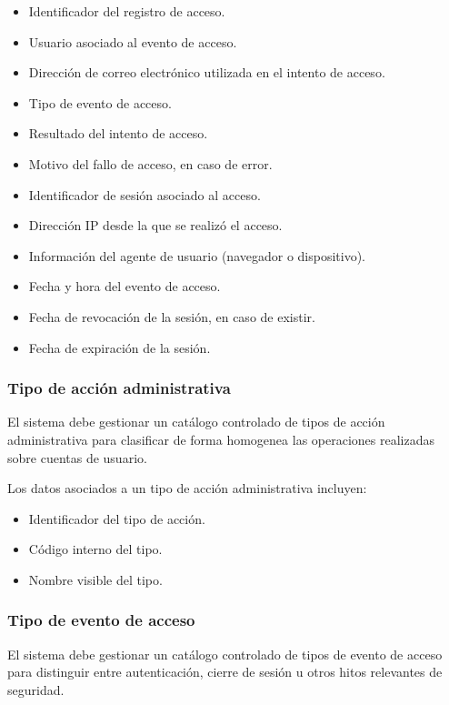 \begin{itemize}
    \item Identificador del registro de acceso.
    \item Usuario asociado al evento de acceso.
    \item Dirección de correo electrónico utilizada en el intento de acceso.
    \item Tipo de evento de acceso.
    \item Resultado del intento de acceso.
    \item Motivo del fallo de acceso, en caso de error.
    \item Identificador de sesión asociado al acceso.
    \item Dirección IP desde la que se realizó el acceso.
    \item Información del agente de usuario (navegador o dispositivo).
    \item Fecha y hora del evento de acceso.
    \item Fecha de revocación de la sesión, en caso de existir.
    \item Fecha de expiración de la sesión.
\end{itemize}

\subsubsection*{Tipo de acción administrativa}

El sistema debe gestionar un catálogo controlado de tipos de acción administrativa para clasificar de forma homogenea las operaciones realizadas sobre cuentas de usuario.

Los datos asociados a un tipo de acción administrativa incluyen:

\begin{itemize}
    \item Identificador del tipo de acción.
    \item Código interno del tipo.
    \item Nombre visible del tipo.
\end{itemize}

\subsubsection*{Tipo de evento de acceso}

El sistema debe gestionar un catálogo controlado de tipos de evento de acceso para distinguir entre autenticación, cierre de sesión u otros hitos relevantes de seguridad.

